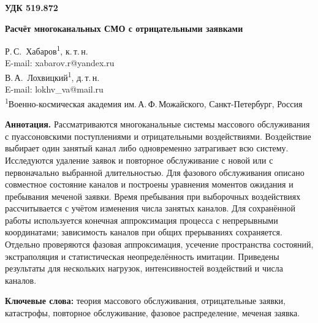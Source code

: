 

\noindent\textbf{УДК 519.872}
\vspace{1em}

\begin{center}
{\Large\bfseries Расчёт многоканальных СМО с отрицательными заявками}
\end{center}
\vspace{0.8em}

\begin{center}
Р.\,С.~Хабаров\textsuperscript{1}, к.\,т.\,н.\\[2pt]
E-mail: xabarov.r@yandex.ru\\[6pt]
В.\,А.~Лохвицкий\textsuperscript{1}, д.\,т.\,н.\\[2pt]
E-mail: lokhv\_va@mail.ru\\[8pt]
{\small\textsuperscript{1}Военно-космическая академия им.\,А.\,Ф.\,Можайского, Санкт-Петербург, Россия}
\end{center}
\vspace{0.5em}

\noindent\textbf{Аннотация.} 
Рассматриваются многоканальные системы массового обслуживания с пуассоновскими поступлениями и отрицательными воздействиями. Воздействие выбирает один занятый канал либо одновременно затрагивает всю систему. Исследуются удаление заявок и повторное обслуживание с новой или с первоначально выбранной длительностью. Для фазового обслуживания описано совместное состояние каналов и построены уравнения моментов ожидания и пребывания меченой заявки. Время пребывания при выборочных воздействиях рассчитывается с учётом изменения числа занятых каналов. Для сохранённой работы используется конечная аппроксимация процесса с непрерывными координатами; зависимость каналов при общих прерываниях сохраняется. Отдельно проверяются фазовая аппроксимация, усечение пространства состояний, экстраполяция и статистическая неопределённость имитации. Приведены результаты для нескольких нагрузок, интенсивностей воздействий и числа каналов.

\textbf{Ключевые слова:} теория массового обслуживания, отрицательные заявки, катастрофы, повторное обслуживание, фазовое распределение, меченая заявка.

